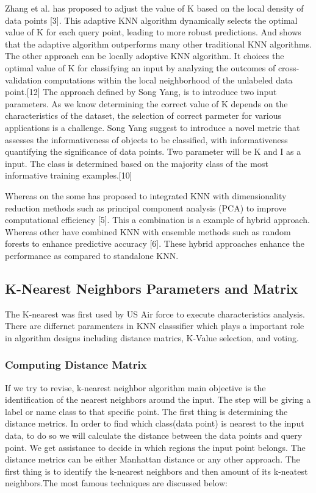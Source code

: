 \documentclass[conference]{IEEEtran}
\begin{document}
Zhang et al. has proposed to adjust the value of K based on the local density of data points [3]. This adaptive KNN algorithm dynamically selects the optimal value of K for each query point, leading to more robust predictions. And shows that the adaptive algorithm outperforms many other traditional KNN algorithms. The other approach can be locally adoptive KNN algorithm. It choices the optimal value of K for classifying an input by analyzing the outcomes of cross-validation computations within the local neighborhood of the unlabeled data point.[12]  The approach defined by Song Yang, is to introduce two input parameters. As we know determining the correct value of K depends on the characteristics of the dataset, the selection of correct parmeter for various applications is a challenge. Song Yang suggest to introduce a novel metric that assesses the informativeness of objects to be classified, with informativeness quantifying the significance of data points. 
Two parameter will be K and I as a input. The class is determined based on the majority class of the most informative training examples.[10]

Whereas on the some has proposed to integrated KNN with dimensionality reduction methods such as principal component analysis (PCA) to improve computational efficiency [5]. This a combination is a example of hybrid approach. Whereas other have combined KNN with ensemble methods such as random forests to enhance predictive accuracy [6]. These hybrid approaches enhance the performance as compared to standalone KNN. 








\subsection{K-Nearest Neighbors Parameters and Matrix}
The K-nearest was first used by US Air force to execute characteristics analysis. There are differnet paramenters in KNN classsifier which plays a important role in algorithm designs including distance matrics, K-Value selection, and voting. 




\subsubsection{\textbf{Computing Distance Matrix}}
If we try to revise, k-nearest neighbor algorithm main objective is the identification of the nearest neighbors around the input. The step will be giving a label or name class to that specific point. The first thing is determining the distance metrics. In order to find which class(data point) is nearest to the input data, to do so we will calculate the distance between the data points and query point. We get assistance to decide in which regions the input point belongs. The distance metrics can be either Manhattan distance or any other approach. The first thing is to identify the k-nearest neighbors and then amount of its k-neatest neighbors.The most famous techniques are discussed below:  
\end{document}
